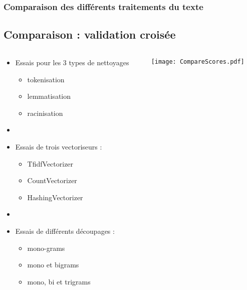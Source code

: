 \documentclass[8pt,aspectratio=169,hyperref={unicode=true}]{beamer}
\begin{document}
\subsubsection{Comparaison des différents traitements du texte}
\begin{frame}{\insertsubsection}{\insertsubsubsection}
    \begin{table}
        \scriptsize
        
    \end{table}
\end{frame}

\subsection{Comparaison : validation croisée}
\begin{frame}{\insertsubsection}
    \begin{columns}
        \begin{column}{.45\textwidth}
            \begin{itemize}
                \item Essais pour les 3 types de nettoyages
                      \begin{itemize}
                          \item tokenisation
                          \item lemmatisation
                          \item racinisation
                      \end{itemize}
                \item[]
                \item Essais de trois vectoriseurs :
                      \begin{itemize}
                          \item TfidfVectorizer
                          \item CountVectorizer
                          \item HashingVectorizer
                      \end{itemize}
                \item[]
                \item Essais de différents découpages :
                      \begin{itemize}
                          \item mono-grams
                          \item mono et bigrams
                          \item mono, bi et trigrams
                      \end{itemize}
            \end{itemize}
        \end{column}
        \begin{column}{.55\textwidth}
            \texttt{[image: CompareScores.pdf]}
        \end{column}
    \end{columns}
\end{frame}
\end{document}
